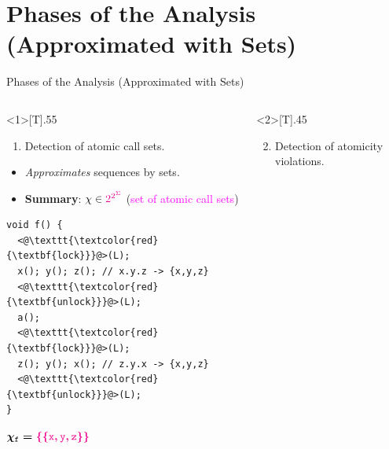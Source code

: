 \documentclass[10pt, xcolor=pdflatex, hyperref={unicode}, aspectratio=169]{beamer}
\begin{document}
\section{Phases of the Analysis (Approximated with Sets)}
\begin{frame}[fragile]{Phases of the Analysis (Approximated with Sets)}
    \begin{columns}
        \begin{column}<1>[T]{.55 \linewidth}
            \begin{enumerate}
                \item Detection of \alert{atomic call sets}.
            \end{enumerate}

            \begin{itemize}
                \item \emph{Approximates} \alert{sequences by sets}.

                \item \textbf{Summary}: $ \chi \in \textcolor{magenta}{2^{2^\Sigma}} $
                    (\textcolor{magenta}{set of atomic call sets})
            \end{itemize}
            
            \hfill

\begin{lstlisting}
void f() {
  <@\texttt{\textcolor{red}{\textbf{lock}}}@>(L);
  x(); y(); z(); // x.y.z -> {x,y,z}
  <@\texttt{\textcolor{red}{\textbf{unlock}}}@>(L);
  a();
  <@\texttt{\textcolor{red}{\textbf{lock}}}@>(L);
  z(); y(); x(); // z.y.x -> {x,y,z}
  <@\texttt{\textcolor{red}{\textbf{unlock}}}@>(L);
}
\end{lstlisting}

            \hfill

            \centering
            \footnotesize

            $ \boldsymbol{\chi_\mathtt{f} = \textcolor{magenta}{\{\{\mathtt{x, y, z}\}\}}} $
            
            \hfill
        \end{column}

        \begin{column}<2>[T]{.45 \linewidth}
            \begin{enumerate}\setcounter{enumi}{1}
                \item Detection of \alert{atomicity violations}.
            \end{enumerate}


\end{column}
\end{columns}
\end{frame}
\end{document}
